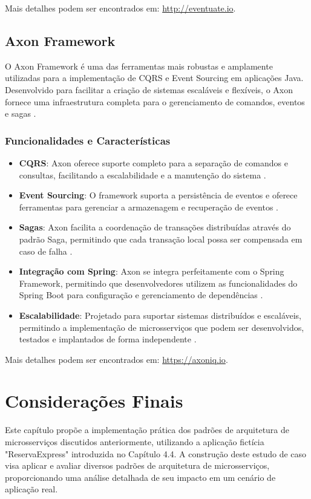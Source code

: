 Mais detalhes podem ser encontrados em: \url{http://eventuate.io}.


\section{Axon Framework}
O Axon Framework é uma das ferramentas mais robustas e amplamente utilizadas para a implementação de CQRS e Event Sourcing em aplicações Java. Desenvolvido para facilitar a criação de sistemas escaláveis e flexíveis, o Axon fornece uma infraestrutura completa para o gerenciamento de comandos, eventos e sagas \cite{AxonIQ2021}.

\subsection{Funcionalidades e Características}
\begin{itemize}
    \item \textbf{CQRS}: Axon oferece suporte completo para a separação de comandos e consultas, facilitando a escalabilidade e a manutenção do sistema \cite{richardson2018}.
    \item \textbf{Event Sourcing}: O framework suporta a persistência de eventos e oferece ferramentas para gerenciar a armazenagem e recuperação de eventos \cite{fowler2005}.
    \item \textbf{Sagas}: Axon facilita a coordenação de transações distribuídas através do padrão Saga, permitindo que cada transação local possa ser compensada em caso de falha \cite{garcia-molina1987}.
    \item \textbf{Integração com Spring}: Axon se integra perfeitamente com o Spring Framework, permitindo que desenvolvedores utilizem as funcionalidades do Spring Boot para configuração e gerenciamento de dependências \cite{AxonIQ2021}.
    \item \textbf{Escalabilidade}: Projetado para suportar sistemas distribuídos e escaláveis, permitindo a implementação de microsserviços que podem ser desenvolvidos, testados e implantados de forma independente \cite{richardson2018}.
\end{itemize} 

Mais detalhes podem ser encontrados em: \url{https://axoniq.io}.

\chapter{Considerações Finais}

Este capítulo propõe a implementação prática dos padrões de arquitetura de microsserviços discutidos anteriormente, utilizando a aplicação fictícia "ReservaExpress" introduzida no Capítulo 4.4. A construção deste estudo de caso visa aplicar e avaliar diversos padrões de arquitetura de microsserviços, proporcionando uma análise detalhada de seu impacto em um cenário de aplicação real.

